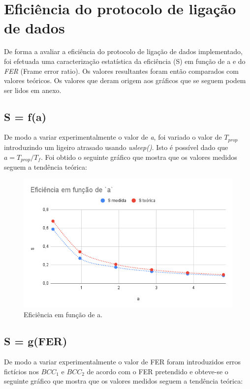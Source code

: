 \documentclass[a4paper,11pt,portuguese]{article}
\begin{document}
\section{Eficiência do protocolo de ligação de dados}

    De forma a avaliar a eficiência do protocolo de ligação de dados implementado, foi efetuada
    uma caracterização estatística da eficiência (S) em função de a e do \textit{FER}
    (Frame error ratio). Os valores resultantes foram então comparados com valores teóricos. \hfill \break
    Os valores que deram origem aos gráficos que se seguem podem ser lidos em anexo.

    \subsection{S = f(a)}
    De modo a variar experimentalmente o valor de \textit{a}, foi variado o valor de $T_{prop}$
    introduzindo um ligeiro atrasado usando \textit{usleep()}. Isto é possível dado que
    $a = T_{prop}/T_f$. Foi obtido o seguinte gráfico que mostra que os valores medidos seguem a
    tendência teórica:

    \begin{figure}[H]
        \centering
        \includegraphics[scale=0.4]{./imgs/a.png}
        \caption{Eficiência em função de a.}
        \label{fig:a}
    \end{figure}


    \subsection{S = g(FER)}
    De modo a variar experimentalmente o valor de FER foram introduzidos erros fictícios nos
    $BCC_1$ e $BCC_2$ de acordo com o FER pretendido e obteve-se o seguinte gráfico que mostra
    que os valores medidos seguem a tendência teórica:
\end{document}
